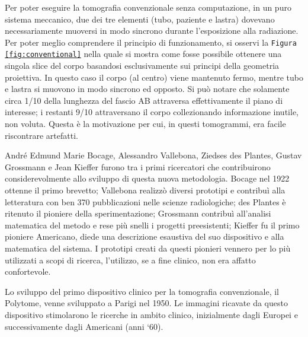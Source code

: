 \documentclass[a4paper,11pt, oneside]{article}
\begin{document}
                        Per poter eseguire la tomografia convenzionale senza computazione, in un puro sistema meccanico, due dei tre elementi (tubo, paziente e lastra) dovevano necessariamente muoversi in modo sincrono durante l’esposizione alla radiazione.
                        Per poter meglio comprendere il principio di funzionamento, si osservi la \texttt{Figura \ref{fig:conventional}} nella quale si mostra come fosse possibile ottenere una singola slice del corpo basandosi esclusivamente sui principi della geometria proiettiva. In questo caso il corpo (al centro) viene mantenuto fermo, mentre tubo e lastra si muovono in modo sincrono ed opposto. Si può notare che solamente circa 1/10 della lunghezza del fascio AB attraversa effettivamente il piano di interesse; i restanti 9/10 attraversano il corpo collezionando informazione inutile, non voluta. Questa è la motivazione per cui, in questi tomogrammi, era facile riscontrare artefatti\cite{hounsfield-nobel-lecture}.

                    \par
                        André Edmund Marie Bocage, Alessandro Vallebona, Ziedses des Plantes, Gustav Grossmann e Jean Kieffer furono tra i primi ricercatori che contribuirono considerevolmente allo sviluppo di questa nuova metodologia. Bocage nel 1922 ottenne il primo brevetto; Vallebona realizzò diversi prototipi e contribuì alla letteratura con ben 370 pubblicazioni nelle scienze radiologiche\cite{vallebona-ricordo}; des Plantes è ritenuto il pioniere della sperimentazione; Grossmann contribuì all’analisi matematica del metodo e rese più snelli i progetti preesistenti; Kieffer fu il primo pioniere Americano, diede una descrizione esaustiva del suo dispositivo e alla matematica del sistema. I prototipi creati da questi pionieri vennero per lo più utilizzati a scopi di ricerca, l'utilizzo, se a fine clinico, non era affatto confortevole.

                    \par
                        Lo sviluppo del primo dispositivo clinico per la tomografia convenzionale, il Polytome, venne sviluppato a Parigi nel 1950. Le immagini ricavate da questo dispositivo stimolarono le ricerche in ambito clinico, inizialmente dagli Europei e successivamente dagli Americani (anni ‘60).
                        
\end{document}
